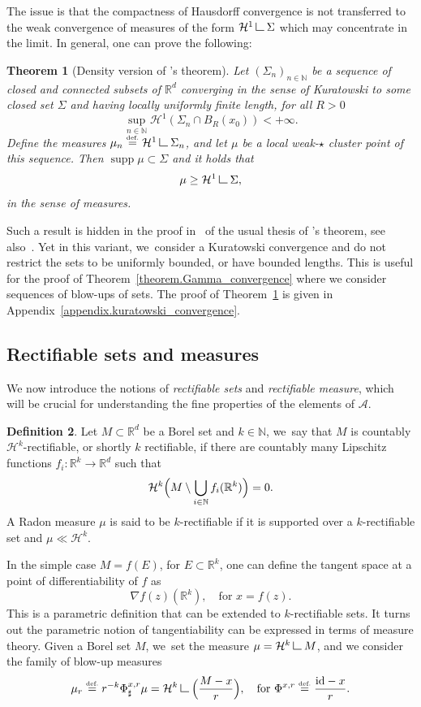 \documentclass[10pt]{amsart}
\newtheorem{theorem}{Theorem}[section]
\theoremstyle{definition}
\newtheorem{definition}[theorem]{Definition}
\newcommand{\eqdef}{\ensuremath{\stackrel{\mbox{\upshape\tiny def.}}{=}}}
\newcommand\LM[1]{\hbox{\vrule width.5pt \vbox to#1pt{\vfill \hrule width#1pt height.5pt}}}
\newcommand\LL{{\mathchoice {\>\LM7\>}{\>\LM7\>}{\,\LM5\,}{\,\LM{3.35}\,}}}
\newcommand{\mres}{\LL}
\newcommand\cH{\mathcal{H}}
\newcommand{\RR}{\mathbb{R}}
\DeclareMathOperator{\supp}{supp}
\begin{document}
The issue is that the compactness of Hausdorff convergence is not transferred to the weak convergence of measures of the form $\cH^1\mres \Sigma$ which may concentrate in the limit.
In general, one can prove the following:
\begin{theorem}[Density version of \Golab's theorem]\label{theorem.Golab_localversion}
Let ${(\Sigma_n)}_{n \in \mathbb{N}}$ be a sequence of closed and connected subsets of $\RR^d$ converging in the sense of Kuratowski to some closed set $\Sigma$ and having locally uniformly finite length, \ie for all $R > 0$
\[
\sup_{n \in \mathbb{N}} \cH^1(\Sigma_n \cap B_R(x_0)) < +\infty.
\]
Define the measures $\mu_n \eqdef \cH^1\mres \Sigma_n$, and let $\mu$ be a local weak-$\star$ cluster point of this sequence. Then $\supp\mu \subset \Sigma$ and it holds that
\[
\mu \ge \cH^1\mres \Sigma,
\]
in the sense of measures.
\end{theorem}
Such a result is hidden in the proof in~\cite{ambrosio2004topics} of the usual thesis of \Golab's theorem, see also~\cite{paolini2013existence}. Yet in this variant, we~consider a Kuratowski convergence and do not restrict the sets to be uniformly bounded, or have bounded lengths.
This is useful for the proof of Theorem~\ref{theorem.Gamma_convergence} where we consider sequences of blow-ups of sets. The proof of Theorem~\ref{theorem.Golab_localversion} is given in Appendix~\ref{appendix.kuratowski_convergence}.

\subsection{Rectifiable sets and measures}
We now introduce
the notions of \emph{rectifiable sets} and \emph{rectifiable measure}, which will be crucial for understanding the fine
properties of the elements of $\mathcal{A}$.
\begin{definition}
Let $M \subset \RR^d$ be a Borel set and $k \in \mathbb{N}$, we~say that $M$ is countably $\cH^k$-rectifiable, or shortly $k$ rectifiable, if there are countably many Lipschitz functions $f_i: \RR^k \to \RR^d$ such that
\[
\cH^k\Bigl(
M \setminus \bigcup_{i \in \mathbb{N}} f_i(\RR^k)
\Bigr)
= 0.
\]
A Radon measure $\mu$ is said to be $k$-rectifiable if it is supported over a $k$-rectifiable set and $\mu \ll \cH^k$.
\end{definition}

In the simple case $M = f(E)$, for $E \subset \RR^k$, one can define the tangent space at a point of differentiability of $f$ as
\[
\nabla f(z)(\RR^k), \quad\text{for $x = f(z)$}.
\]
This is a parametric definition that can be extended to $k$-rectifiable sets. It turns out the parametric notion of tangentiability can be expressed in terms of measure theory. Given a Borel set $M$, we~set the measure $\mu = \cH^k\mres M$, and we consider the family of blow-up measures
\begin{equation}\label{blowup_measure_operator}
\mu_r \eqdef r^{-k} \Phi^{x,r}_\sharp \mu = \cH^k\mres \Bigl(\frac{M - x}{r}\Bigr), \quad\text{for }
\Phi^{x,r}\eqdef \frac{\text{id} - x}{r}.
\end{equation}
\end{document}

